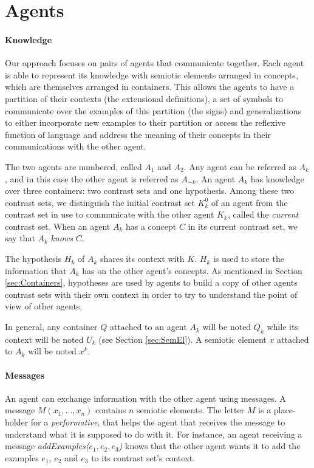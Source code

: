 \section{Agents}\label{sec:SemAg}

\paragraph{Knowledge}

Our approach focuses on pairs of agents that communicate together. Each agent is able to represent its knowledge with semiotic elements arranged in concepts, which are themselves arranged in containers. This allows the agents to have a partition of their contexts (the extensional definitions), a set of symbols to communicate over the examples of this partition (the signs) and generalizations to either incorporate new examples to their partition or access the reflexive function of language and address the meaning of their concepts in their communications with the other agent.

The two agents are numbered, called $A_{1}$ and $A_{2}$. Any agent can be referred as $A_{k}$, and in this case the other agent is referred as $A_{-k}$. An agent $A_{k}$ has knowledge over three containers: two contrast sets and one hypothesis. Among these two contrast sets, we distinguish the initial contrast set $K^{0}_{k}$ of an agent from the contrast set in use to communicate with the other agent $K_{k}$, called the \emph{current} contrast set. When an agent $A_{k}$ has a concept $C$ in its current contrast set, we say that $A_{k}$ \emph{knows} $C$.

The hypothesis $H_{k}$ of $A_{k}$ shares its context with $K$. $H_{k}$ is used to store the information that $A_{k}$ has on the other agent's concepts. As mentioned in Section \ref{sec:Containers}, hypotheses are used by agents to build a copy of other agents contrast sets with their own context in order to try to understand the point of view of other agents.

In general, any container $Q$ attached to an agent $A_{k}$ will be noted $Q_{k}$ while its context will be noted $U_{k}$ (see Section \ref{sec:SemEl}). A semiotic element $x$ attached to $A_{k}$ will be noted $x^{k}$.

\paragraph{Messages}

An agent can exchange information with the other agent using messages. A message $M(x_1, \ldots, x_n)$ contains $n$ semiotic elements. The letter $M$ is a place-holder for a \emph{performative}, that helps the agent that receives the message to understand what it is supposed to do with it. For instance, an agent receiving a message \emph{addExamples($e_1,e_2,e_3$)} knows that the other agent wants it to add the examples $e_1$, $e_2$ and $e_3$ to its contrast set's context.

